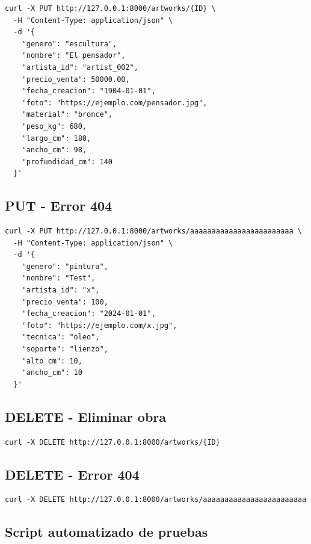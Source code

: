 \documentclass[12pt,a4paper]{article}
\begin{document}
\begin{lstlisting}[style=bash, caption=Actualizar escultura]
curl -X PUT http://127.0.0.1:8000/artworks/{ID} \
  -H "Content-Type: application/json" \
  -d '{
    "genero": "escultura",
    "nombre": "El pensador",
    "artista_id": "artist_002",
    "precio_venta": 50000.00,
    "fecha_creacion": "1904-01-01",
    "foto": "https://ejemplo.com/pensador.jpg",
    "material": "bronce",
    "peso_kg": 680,
    "largo_cm": 180,
    "ancho_cm": 98,
    "profundidad_cm": 140
  }'
\end{lstlisting}

\subsection{PUT - Error 404}

\begin{lstlisting}[style=bash, caption=ID inexistente]
curl -X PUT http://127.0.0.1:8000/artworks/aaaaaaaaaaaaaaaaaaaaaaaa \
  -H "Content-Type: application/json" \
  -d '{
    "genero": "pintura",
    "nombre": "Test",
    "artista_id": "x",
    "precio_venta": 100,
    "fecha_creacion": "2024-01-01",
    "foto": "https://ejemplo.com/x.jpg",
    "tecnica": "oleo",
    "soporte": "lienzo",
    "alto_cm": 10,
    "ancho_cm": 10
  }'
\end{lstlisting}

\subsection{DELETE - Eliminar obra}

\begin{lstlisting}[style=bash, caption=Eliminar obra]
curl -X DELETE http://127.0.0.1:8000/artworks/{ID}
\end{lstlisting}

\subsection{DELETE - Error 404}

\begin{lstlisting}[style=bash, caption=ID inexistente]
curl -X DELETE http://127.0.0.1:8000/artworks/aaaaaaaaaaaaaaaaaaaaaaaa
\end{lstlisting}

\subsection{Script automatizado de pruebas}
\end{document}
